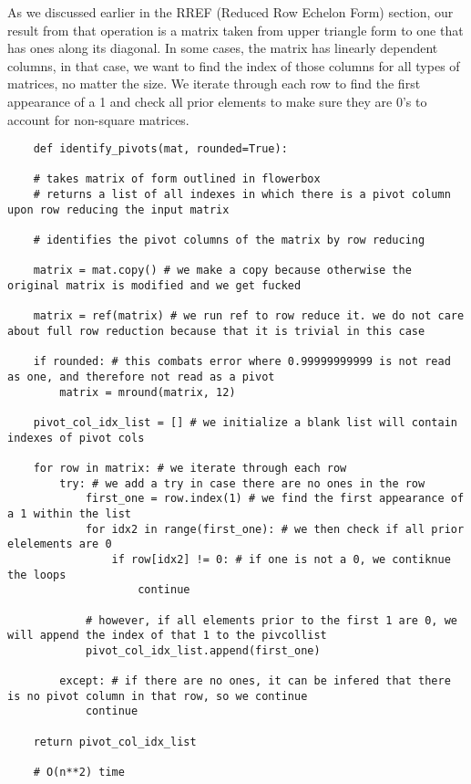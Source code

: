\documentclass[12pt, a4paper]{article}
\begin{document}
As we discussed earlier in the RREF (Reduced Row Echelon Form) section, our result from that operation
is a matrix taken from upper triangle form to one that has ones along its diagonal. In some cases, the matrix has linearly dependent columns,
in that case, we want to find the index of those columns for all types of matrices, no matter the size. We iterate through each row to find the first appearance of a 1
and check all prior elements to make sure they are 0's to account for non-square matrices.

\begin{lstlisting}
    def identify_pivots(mat, rounded=True):

    # takes matrix of form outlined in flowerbox
    # returns a list of all indexes in which there is a pivot column upon row reducing the input matrix

    # identifies the pivot columns of the matrix by row reducing

    matrix = mat.copy() # we make a copy because otherwise the original matrix is modified and we get fucked

    matrix = ref(matrix) # we run ref to row reduce it. we do not care about full row reduction because that it is trivial in this case
    
    if rounded: # this combats error where 0.99999999999 is not read as one, and therefore not read as a pivot
        matrix = mround(matrix, 12)

    pivot_col_idx_list = [] # we initialize a blank list will contain indexes of pivot cols

    for row in matrix: # we iterate through each row
        try: # we add a try in case there are no ones in the row
            first_one = row.index(1) # we find the first appearance of a 1 within the list
            for idx2 in range(first_one): # we then check if all prior elelements are 0
                if row[idx2] != 0: # if one is not a 0, we contiknue the loops
                    continue

            # however, if all elements prior to the first 1 are 0, we will append the index of that 1 to the pivcollist
            pivot_col_idx_list.append(first_one)

        except: # if there are no ones, it can be infered that there is no pivot column in that row, so we continue
            continue 

    return pivot_col_idx_list    

    # O(n**2) time
\end{lstlisting}
\end{document}
